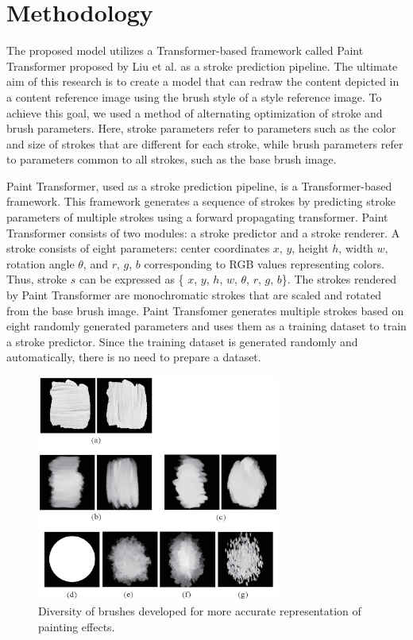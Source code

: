 \documentclass{mva_style}
\begin{document}
\section{Methodology}
The proposed model utilizes a Transformer-based framework called Paint 
Transformer proposed by Liu et al.\cite{PaintTransformer} as a stroke prediction 
pipeline. The ultimate aim of this research is to create a model that can 
redraw the content depicted in a content reference image using the brush 
style of a style reference image. To achieve this goal, we used a method 
of alternating optimization of stroke and brush parameters.
Here, stroke parameters refer to parameters such as the color and size of 
strokes that are different for each stroke, while brush parameters refer to 
parameters common to all strokes, such as the base brush image.

Paint Transformer, used as a stroke prediction pipeline, is a Transformer-based 
framework. This framework generates a sequence of strokes by predicting 
stroke parameters of multiple strokes using a forward propagating transformer.
Paint Transformer consists of two modules: a stroke predictor and a stroke 
renderer. 
A stroke consists of eight parameters: center coordinates $x$, $y$, height $h$,
width $w$, rotation angle $\theta$, and $r$, $g$, $b$ corresponding to RGB values 
representing colors. Thus, stroke $s$ can be expressed as \{ $x$, $y$, $h$, $w$, $\theta$, $r$, $g$, $b$\}.
The strokes rendered by Paint Transformer are monochromatic strokes that are 
scaled and rotated from the base brush image. 
Paint Transfomer generates multiple strokes based on eight randomly generated 
parameters and uses them as a training dataset to train a stroke predictor. 
Since the training dataset is generated randomly and automatically, there is 
no need to prepare a dataset. 

\begin{figure}
  \centering
  \includegraphics[width=80mm]{resource/brushes.eps}
  \caption{Diversity of brushes developed for more accurate representation of painting effects.}
  \label{fig:brushes}
\end{figure}
\end{document}
